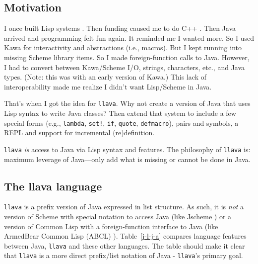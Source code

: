 \documentclass{acm-final/sig-alternate-modified}
\begin{document}
\subsection{Motivation}

I once built Lisp systems \cite{LaSC5,LaSC3}.  Then funding caused me
to do C++ \cite{DC++}.  Then Java arrived and programming felt fun
again.  It reminded me I wanted more.  So I used Kawa \cite{kawa} for
interactivity and abstractions (i.e., macros).  But I kept running
into missing Scheme library items.  So I made foreign-function calls
to Java.  However, I had to convert between Kawa/Scheme I/O, strings,
characters, etc., and Java types.  (Note: this was with an early
version of Kawa.)  This lack of interoperability made me realize I
didn't want Lisp/Scheme in Java.

That's when I got the idea for {\tt llava}.  Why not create a version
of Java that uses Lisp syntax to write Java classes?  Then extend that
system to include a few special forms (e.g., {\tt lambda}, {\tt set!},
{\tt if}, {\tt quote}, {\tt defmacro}), pairs and symbols, a REPL
and support for incremental (re)definition.

{\tt llava} \emph{is} access to Java via Lisp syntax and features.
The philosophy of {\tt llava} is: maximum leverage of Java---only add
what is missing or cannot be done in Java.

\subsection{The llava language}
\label{the-llava-language}

{\tt llava} is a prefix version of Java expressed in list structure.
As such, it is \emph{not} a version of Scheme with special notation to
access Java (like Jscheme \cite{JschemeDot}) or a version of Common Lisp
with a foreign-function interface to Java (like ArmedBear Common Lisp
(ABCL) \cite{abcl}).  Table~\ref{j-l-j-a} compares language features
between Java, {\tt llava} and these other languages.  The table should
make it clear that {\tt llava} is a more direct prefix/list notation
of Java - {\tt llava}'s primary goal.
\end{document}
